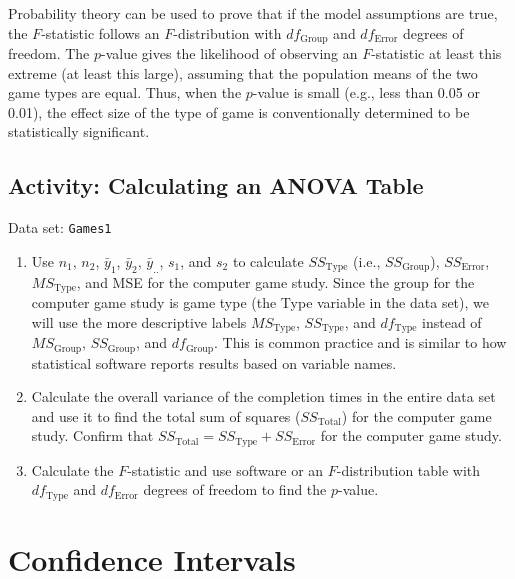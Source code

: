 \documentclass[
]{book}
\begin{document}
Probability theory can be used to prove that if the model assumptions are true, the \(F\)-statistic follows an \(F\)-distribution with \(df_{\text{Group}}\) and \(df_{\text{Error}}\) degrees of freedom. The \(p\)-value gives the likelihood of observing an \(F\)-statistic at least this extreme (at least this large), assuming that the population means of the two game types are equal. Thus, when the \(p\)-value is small (e.g., less than 0.05 or 0.01), the effect size of the type of game is conventionally determined to be statistically significant.

\hypertarget{activity-calculating-an-anova-table}{%
\subsection*{Activity: Calculating an ANOVA Table}\label{activity-calculating-an-anova-table}}

Data set: \texttt{Games1}

\begin{enumerate}
\def\labelenumi{\arabic{enumi}.}
\setcounter{enumi}{36}
\item
  Use \(n_1\), \(n_2\), \(\bar{y}_1\), \(\bar{y}_2\), \(\bar{y}_{..}\), \(s_1\), and \(s_2\) to calculate \(SS_{\text{Type}}\) (i.e., \(SS_{\text{Group}}\)), \(SS_{\text{Error}}\), \(MS_{\text{Type}}\), and MSE for the computer game study. Since the group for the computer game study is game type (the Type variable in the data set), we will use the more descriptive labels \(MS_{\text{Type}}\), \(SS_{\text{Type}}\), and \(df_{\text{Type}}\) instead of \(MS_{\text{Group}}\), \(SS_{\text{Group}}\), and \(df_{\text{Group}}\). This is common practice and is similar to how statistical software reports results based on variable names.
\item
  Calculate the overall variance of the completion times in the entire data set and use it to find the total sum of squares (\(SS_{\text{Total}}\)) for the computer game study. Confirm that \(SS_{\text{Total}} = SS_{\text{Type}} + SS_{\text{Error}}\) for the computer game study.
\item
  Calculate the \(F\)-statistic and use software or an \(F\)-distribution table with \(df_{\text{Type}}\) and \(df_{\text{Error}}\) degrees of freedom to find the \(p\)-value.
\end{enumerate}

\hypertarget{confidence-intervals}{%
\section{Confidence Intervals}\label{confidence-intervals}}
\end{document}
